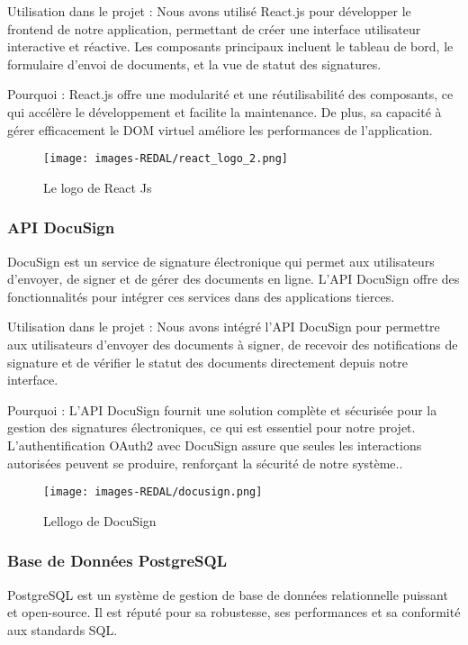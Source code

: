 Utilisation dans le projet : Nous avons utilisé React.js pour développer le frontend de notre application, permettant de créer une interface utilisateur interactive et réactive. Les composants principaux incluent le tableau de bord, le formulaire d'envoi de documents, et la vue de statut des signatures.

Pourquoi : React.js offre une modularité et une réutilisabilité des composants, ce qui accélère le développement et facilite la maintenance. De plus, sa capacité à gérer efficacement le DOM virtuel améliore les performances de l'application.

\begin{figure}[H]
\begin{center}
\texttt{[image: images-REDAL/react\_logo\_2.png]}
\end{center}
\caption{Le logo de React Js}
\end{figure}

\subsubsection{API DocuSign}
DocuSign est un service de signature électronique qui permet aux utilisateurs d'envoyer, de signer et de gérer des documents en ligne. L'API DocuSign offre des fonctionnalités pour intégrer ces services dans des applications tierces.

Utilisation dans le projet : Nous avons intégré l'API DocuSign pour permettre aux utilisateurs d'envoyer des documents à signer, de recevoir des notifications de signature et de vérifier le statut des documents directement depuis notre interface.

Pourquoi : L'API DocuSign fournit une solution complète et sécurisée pour la gestion des signatures électroniques, ce qui est essentiel pour notre projet. L'authentification OAuth2 avec DocuSign assure que seules les interactions autorisées peuvent se produire, renforçant la sécurité de notre système..

\begin{figure}[H]
\begin{center}
\texttt{[image: images-REDAL/docusign.png]}
\end{center}
\caption{Lellogo de DocuSign}
\end{figure}


\subsubsection{Base de Données PostgreSQL}
PostgreSQL est un système de gestion de base de données relationnelle puissant et open-source. Il est réputé pour sa robustesse, ses performances et sa conformité aux standards SQL.

